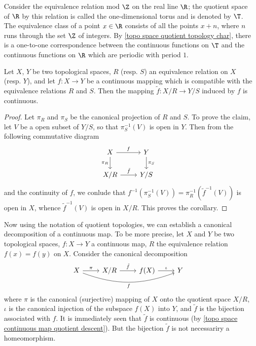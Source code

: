 \begin{example}
Consider the equivalence relation mod $\Z$ on the real line $\R$; the quotient space of $\R$ by this relation is called the one-dimensional torus and is denoted by $\T$. The equivalence class of a point $x\in\R$ consists of all the points $x+n$, where $n$ runs through the set $\Z$ of integers. By \cref{topo space quotient topology char}, there is a one-to-one correspondence between the continuous functions on $\T$ and the continuous functions on $\R$ which are periodic with period $1$.
\end{example}
\begin{corollary}\label{topo space continuous map quotient descent}
Let $X$, $Y$ be two topological spaces, $R$ (resp. $S$) an equivalence relation on $X$ (resp. $Y$), and let $f:X\to Y$ be a continuous mapping which is compatible with the equivalence relations $R$ and $S$. Then the mapping $\tilde{f}:X/R\to Y/S$ induced by $f$ is continuous.
\end{corollary}
\begin{proof}
Let $\pi_R$ and $\pi_S$ be the canonical projection of $R$ and $S$. To prove the claim, let $V$ be a open subset of $Y/S$, so that $\pi_S^{-1}(V)$ is open in $Y$. Then from the following commutative diagram 
\[\begin{tikzcd}
X\ar[d,swap,"\pi_R"]\ar[r,"f"]&Y\ar[d,"\pi_S"]\\
X/R\ar[r,"\tilde{f}"]&Y/S
\end{tikzcd}\]
and the continuity of $f$, we conlude that $f^{-1}(\pi_S^{-1}(V))=\pi_R^{-1}(\tilde{f}^{-1}(V))$ is open in $X$, whence $\tilde{f}^{-1}(V)$ is open in $X/R$. This proves the corollary.
\end{proof}
Now using the notation of quotient topologies, we can establish a canonical decomposition of a continuous map. To be more precise, let $X$ and $Y$ be two topological spaces, $f:X\to Y$ a continuous map, $R$ the equivalence relation $f(x)=f(y)$ on $X$. Consider the canonical decomposition
\[\begin{tikzcd}
X\ar[rrr,bend right=20pt,swap,"f"]\ar[r,"\pi"]&X/R\ar[r,"\tilde{f}"]&f(X)\ar[r,"\iota"]&Y
\end{tikzcd}\]
where $\pi$ is the canonical (surjective) mapping of $X$ onto the quotient space $X/R$, $\iota$ is the canonical injection of the subspace $f(X)$ into $Y$, and $\tilde{f}$ is the bijection associated with $f$. It is immediately seen that $\tilde{f}$ is continuous (by \cref{topo space continuous map quotient descent}). But the bijection $\tilde{f}$ is not necessariry a homeomorphism.
